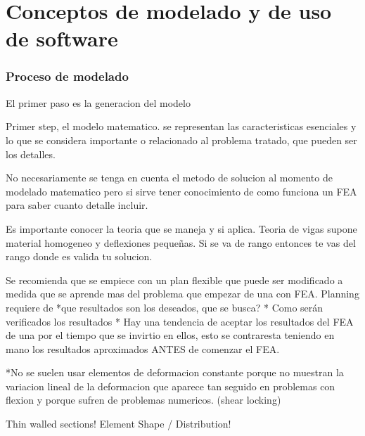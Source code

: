 \part{Conceptos de modelado y de uso de software}
\section{Proceso de modelado}
El primer paso es la generacion del modelo

Primer step, el modelo matematico. se representan las caracteristicas esenciales y lo
que se considera importante o relacionado al problema tratado, que pueden ser los detalles.

No necesariamente se tenga en cuenta el metodo de solucion al momento de modelado matematico
pero si sirve tener conocimiento de como funciona un FEA para saber cuanto detalle incluir.

Es importante conocer la teoria que se maneja y si aplica. Teoria de vigas supone material homogeneo y 
deflexiones pequeñas. Si se va de rango entonces te vas del rango donde es valida tu solucion.

Se recomienda que se empiece con un plan flexible que puede ser modificado a medida que se aprende mas del problema
que empezar de una con FEA. Planning requiere de 
*que resultados son los deseados, que se busca?
* Como serán verificados los resultados
* Hay una tendencia de aceptar los resultados del FEA de una por el tiempo que se invirtio en ellos,
esto se contraresta teniendo en mano los resultados aproximados ANTES de comenzar el FEA. 

*No se suelen usar elementos de deformacion constante porque no muestran la variacion lineal de la 
deformacion que aparece tan seguido en problemas con flexion y porque sufren de problemas numericos. 
(shear locking)

Thin walled sections!
Element Shape / Distribution!